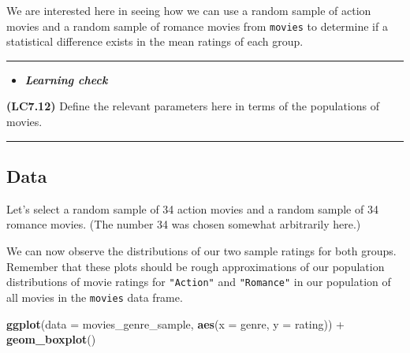 \documentclass[]{tufte-book}
\newenvironment{Shaded}{\begin{snugshade}}{\end{snugshade}}
\newcommand{\KeywordTok}[1]{\textcolor[rgb]{0.13,0.29,0.53}{\textbf{{#1}}}}
\newcommand{\DataTypeTok}[1]{\textcolor[rgb]{0.13,0.29,0.53}{{#1}}}
\newcommand{\DecValTok}[1]{\textcolor[rgb]{0.00,0.00,0.81}{{#1}}}
\newcommand{\StringTok}[1]{\textcolor[rgb]{0.31,0.60,0.02}{{#1}}}
\newcommand{\NormalTok}[1]{{#1}}
\let\oldrule=\rule
\renewcommand{\rule}[1]{\oldrule{\linewidth}}
\newenvironment{rmdblock}[1]
  {\begin{shaded*}
  \begin{itemize}
  \renewcommand{\labelitemi}{
    \raisebox{-.7\height}[0pt][0pt]{
    }
  }
  \item
  }
  {
  \end{itemize}
  \end{shaded*}
  }
\newenvironment{learncheck}
  {\begin{rmdblock}{warning}}
  {\end{rmdblock}}
\begin{document}
We are interested here in seeing how we can use a random sample of
action movies and a random sample of romance movies from \texttt{movies}
to determine if a statistical difference exists in the mean ratings of
each group.

\begin{center}\rule{0.5\linewidth}{\linethickness}\end{center}

\begin{learncheck}
\textbf{\emph{Learning check}}
\end{learncheck}

\textbf{(LC7.12)} Define the relevant parameters here in terms of the
populations of movies.

\begin{center}\rule{0.5\linewidth}{\linethickness}\end{center}

\subsection{Data}\label{data-1}

Let's select a random sample of 34 action movies and a random sample of
34 romance movies. (The number 34 was chosen somewhat arbitrarily here.)

\begin{Shaded}
\end{Shaded}

We can now observe the distributions of our two sample ratings for both
groups. Remember that these plots should be rough approximations of our
population distributions of movie ratings for \texttt{"Action"} and
\texttt{"Romance"} in our population of all movies in the
\texttt{movies} data frame.

\begin{Shaded}
\begin{Highlighting}[]
\KeywordTok{ggplot}\NormalTok{(}\DataTypeTok{data =} \NormalTok{movies_genre_sample, }\KeywordTok{aes}\NormalTok{(}\DataTypeTok{x =} \NormalTok{genre, }\DataTypeTok{y =} \NormalTok{rating)) +}
\StringTok{  }\KeywordTok{geom_boxplot}\NormalTok{()}
\end{Highlighting}
\end{Shaded}
\end{document}
